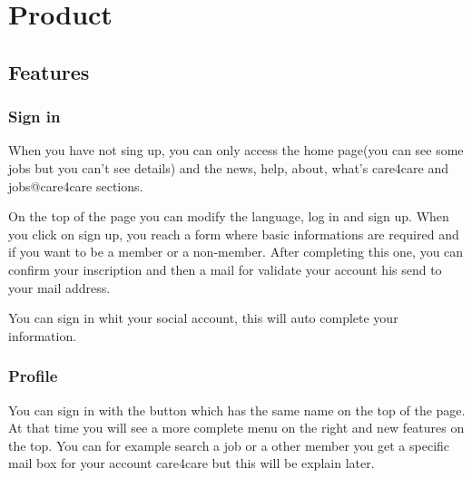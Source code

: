 \documentclass[11pt, a4paper]{article}   	%
\begin{document}
\section{Product}

\subsection{Features}

\subsubsection{Sign in}

When you have not sing up, you can only access the home page(you can see some jobs but you can't see details) and the news, help, about, what's care4care and jobs@care4care sections.
\newline

On the top of the page you can modify the language, log in and sign up. When you click on sign up, you reach a form where basic informations are required and if you want to be a member or a non-member. After completing this one, you can confirm your inscription and then a mail for validate your account his send to your mail address.
\newline

You can sign in whit your social account, this will auto complete your information.

\subsubsection{Profile}

You can sign in with the button which has the same name on the top of the page. At that time you will see a more complete menu on the right and new features on the top. You can for example search a job or a other member you get a specific mail box for your account care4care but this will be explain later.
\newline
\end{document}

